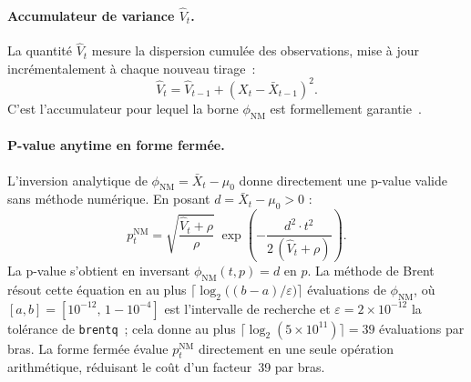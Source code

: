 \documentclass[10.5pt,a4paper]{article}
\newcommand{\phinm}{\phi_{\mathrm{NM}}}
\begin{document}
\paragraph{Accumulateur de variance $\hat{V}_t$.}
La quantit\'e $\hat{V}_t$ mesure la dispersion cumul\'ee des observations,
mise \`a jour incr\'ementalement \`a chaque nouveau tirage~:
\[
  \hat{V}_t = \hat{V}_{t-1} + (X_t - \bar{X}_{t-1})^2.
\]
C'est l'accumulateur pour lequel la borne $\phinm$ est formellement
garantie~\cite{howard2021}.

\paragraph{P-value anytime en forme ferm\'ee.}
L'inversion analytique de $\phinm = \bar{X}_t - \mu_0$ donne directement
une p-value valide sans m\'ethode num\'erique. En posant
$d = \bar{X}_t - \mu_0 > 0$ :
\[
  p_t^{\mathrm{NM}}
  = \sqrt{\frac{\hat{V}_t + \rho}{\rho}}\;
    \exp\!\left(-\frac{d^2\cdot t^2}{2\,(\hat{V}_t+\rho)}\right).
\]
La p-value s'obtient en inversant $\phinm(t,p) = d$ en $p$.
La m\'ethode de Brent r\'esout cette \'equation en au plus
$\bigl\lceil \log_2\!\bigl((b-a)/\varepsilon\bigr) \bigr\rceil$
\'evaluations de $\phinm$, o\`u $[a,b]=[10^{-12},\,1-10^{-4}]$
est l'intervalle de recherche et $\varepsilon = 2\times10^{-12}$
la tol\'erance de \texttt{brentq}~; cela donne au plus
$\lceil \log_2(5\times 10^{11}) \rceil = 39$
\'evaluations par bras. La forme ferm\'ee \'evalue $p_t^{\mathrm{NM}}$
directement en une seule op\'eration arithm\'etique, r\'eduisant
le co\^ut d'un facteur~39 par bras.
\end{document}
